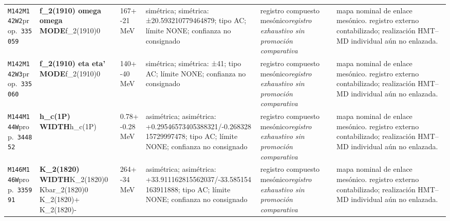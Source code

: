 \begin{landscape}
\begin{longtable}{L{1.85cm}L{4.45cm}L{2.35cm}L{4.05cm}L{3.35cm}L{7.15cm}}
\texttt{M142}\newline \texttt{M142W2}\newline prop.\ \texttt{335059} & \textbf{f\_\allowbreak{}2(1910) omega omega MODE}\newline f\_\allowbreak{}2(1910)0 & 167+-21\,MeV & simétrica; simétrica: ±20.593210779464879; tipo AC; límite NONE; confianza no consignado & registro compuesto mesónico\newline \emph{registro exhaustivo sin promoción comparativa} & mapa nominal de enlace mesónico. registro externo contabilizado; realización HMT--MD individual aún no enlazada. \\
\texttt{M142}\newline \texttt{M142W3}\newline prop.\ \texttt{335060} & \textbf{f\_\allowbreak{}2(1910) eta eta' MODE}\newline f\_\allowbreak{}2(1910)0 & 140+-40\,MeV & simétrica; simétrica: ±41; tipo AC; límite NONE; confianza no consignado & registro compuesto mesónico\newline \emph{registro exhaustivo sin promoción comparativa} & mapa nominal de enlace mesónico. registro externo contabilizado; realización HMT--MD individual aún no enlazada. \\
\texttt{M144}\newline \texttt{M144W}\newline prop.\ \texttt{344852} & \textbf{h\_\allowbreak{}c(1P) WIDTH}\newline h\_\allowbreak{}c(1P) & 0.78+-0.28\,MeV & asimétrica; asimétrica: +0.29546573405388321/-0.26832815729997478; tipo AC; límite NONE; confianza no consignado & registro compuesto mesónico\newline \emph{registro exhaustivo sin promoción comparativa} & mapa nominal de enlace mesónico. registro externo contabilizado; realización HMT--MD individual aún no enlazada. \\
\texttt{M146}\newline \texttt{M146W}\newline prop.\ \texttt{335991} & \textbf{K\_\allowbreak{}2(1820) WIDTH}\newline K\_\allowbreak{}2(1820)0 \textbar{}\allowbreak{} Kbar\_\allowbreak{}2(1820)0 \textbar{}\allowbreak{} K\_\allowbreak{}2(1820)+ \textbar{}\allowbreak{} K\_\allowbreak{}2(1820)- & 264+-34\,MeV & asimétrica; asimétrica: +33.911162815562037/-33.585154163911888; tipo AC; límite NONE; confianza no consignado & registro compuesto mesónico\newline \emph{registro exhaustivo sin promoción comparativa} & mapa nominal de enlace mesónico. registro externo contabilizado; realización HMT--MD individual aún no enlazada. \\

\end{longtable}
\end{landscape}
